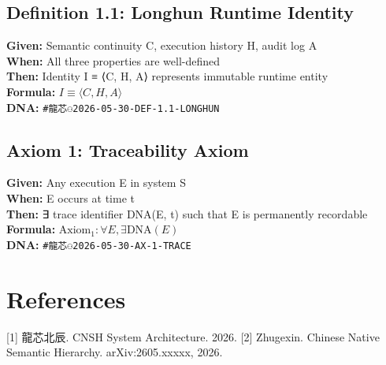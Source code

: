 \documentclass[11pt]{article}
\begin{document}
\subsection{Definition 1.1: Longhun Runtime Identity}
\textbf{Given:} Semantic continuity C, execution history H, audit log A\\
\textbf{When:} All three properties are well-defined\\
\textbf{Then:} Identity I ≡ ⟨C, H, A⟩ represents immutable runtime entity\\
\textbf{Formula:} $I \equiv \langle C, H, A \rangle$\\
\textbf{DNA:} \texttt{#龍芯⚇️2026-05-30-DEF-1.1-LONGHUN}

\subsection{Axiom 1: Traceability Axiom}
\textbf{Given:} Any execution E in system S\\
\textbf{When:} E occurs at time t\\
\textbf{Then:} ∃ trace identifier DNA(E, t) such that E is permanently recordable\\
\textbf{Formula:} $\text{Axiom}_1: \forall E, \exists \text{DNA}(E)$\\
\textbf{DNA:} \texttt{#龍芯⚇️2026-05-30-AX-1-TRACE}

\section{References}

[1] 龍芯北辰. CNSH System Architecture. 2026.
[2] Zhugexin. Chinese Native Semantic Hierarchy. arXiv:2605.xxxxx, 2026.
\end{document}
